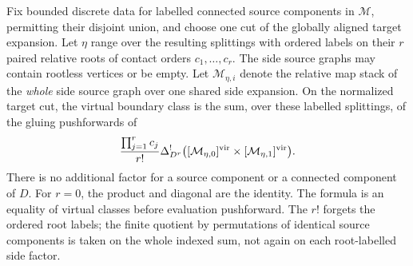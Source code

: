 \begin{lemma}
\label{ev:aligned-cut}
Fix bounded discrete data for labelled connected source components
in $\mathcal M$, permitting their disjoint union, and choose one cut
of the globally aligned target expansion.  Let $\eta$ range over the
resulting splittings with ordered labels on their $r$ paired relative
roots of contact
orders $c_1,\ldots,c_r$.  The side source graphs may contain rootless
vertices or be empty.  Let $\mathcal M_{\eta,i}$ denote the relative
map stack of the \emph{whole} side source graph over one shared side
expansion.  On the normalized target cut, the virtual boundary class
is the sum, over these labelled splittings, of the gluing pushforwards
of
\begin{equation}
\label{ev:aligned-cut-formula}
 \frac{\prod_{j=1}^r c_j}{r!}
 \Delta_{D^r}^{!}
 \bigl([\mathcal M_{\eta,0}]^{\mathrm{vir}}
       \times[\mathcal M_{\eta,1}]^{\mathrm{vir}}\bigr).
\end{equation}
There is no additional factor for a source component or a connected
component of $D$.  For $r=0$, the product and diagonal are the identity.
The formula is an equality of virtual classes before evaluation
pushforward.  The $r!$ forgets the ordered root labels; the finite
quotient by permutations of identical source components is taken on
the whole indexed sum, not again on each root-labelled side factor.
\end{lemma}

